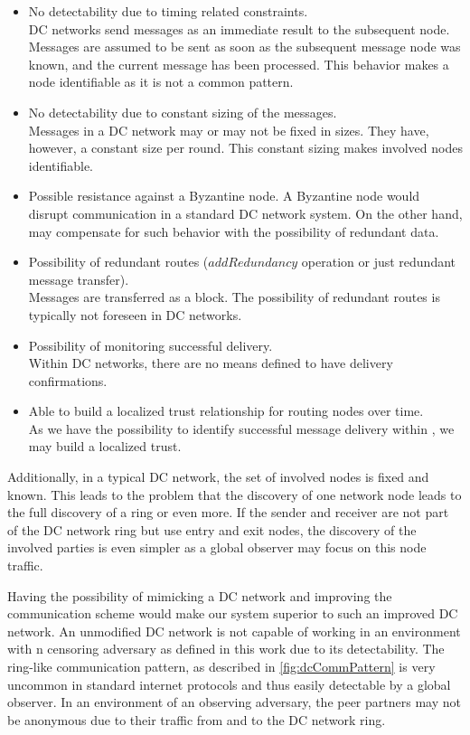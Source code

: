 \begin{itemize}
	\item No detectability due to timing related constraints.\\
	      DC networks send messages as an immediate result to the subsequent node. Messages are assumed to be sent as soon as the subsequent message node was known, and the current message has been processed. This behavior makes a node identifiable as it is not a common pattern.
	\item No detectability due to constant sizing of the messages.\\
	      Messages in a DC network may or may not be fixed in sizes. They have, however, a constant size per round. This constant sizing makes involved nodes identifiable.
	\item Possible resistance against a Byzantine node.
	      A Byzantine node would disrupt communication in a standard DC network system. On the other hand, \MessageVortex{} may compensate for such behavior with the possibility of redundant data.
	\item Possibility of redundant routes ($addRedundancy$ operation or just redundant message transfer).\\
	      Messages are transferred as a block. The possibility of redundant routes is typically not foreseen in DC networks.
	\item Possibility of monitoring successful delivery.\\
	      Within DC networks, there are no means defined to have delivery confirmations.
	\item Able to build a localized trust relationship for routing nodes over time.\\
	      As we have the possibility to identify successful message delivery within \MessageVortex{}, we may build a localized trust.
\end{itemize}

Additionally, in a typical DC network, the set of involved nodes is fixed and known. This leads to the problem that the discovery of one network node leads to the full discovery of a ring or even more. If the sender and receiver are not part of the DC network ring but use entry and exit nodes, the discovery of the involved parties is even simpler as a global observer may focus on this node traffic. 

Having the possibility of mimicking a DC network and improving the communication scheme would make our system superior to such an improved DC network. An unmodified DC network is not capable of working in an environment with n censoring adversary as defined in this work due to its detectability. The ring-like communication pattern, as described in \cref{fig:dcCommPattern} is very uncommon in standard internet protocols and thus easily detectable by a global observer. In an environment of an observing adversary, the peer partners may not be anonymous due to their traffic from and to the DC network ring.

